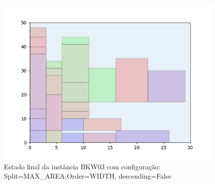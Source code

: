 \begin{figure}[H]
    \centering
    \caption[]{Estado final da instância BKW03 com configuração: Split=MAX_AREA,Order=WIDTH, descending=False}
    \label{fig:bkw03-max_area-width-false}
    \includegraphics[scale=0.5]{output/figures/bkw/bkw03/max_area/width/false/00}
\end{figure}